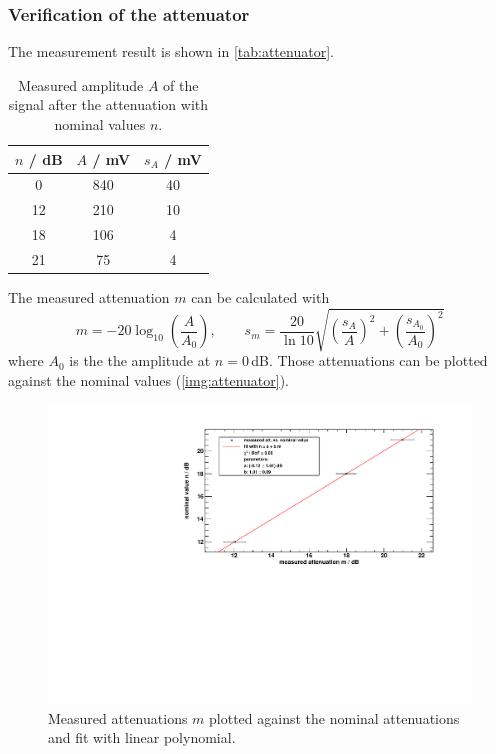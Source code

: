 \subsubsection{Verification of the attenuator}
The measurement result is shown in \autoref{tab:attenuator}.
\begin{table}
\caption{Measured amplitude $A$ of the signal after the attenuation with nominal values $n$.}
\begin{center}
\begin{tabular}{|c|c|c|}
    \hline
    $n$ / dB 	& $A$ / mV 	& $s_A$ / mV	\\ \hline \hline
    0 			& 840		& 40			\\ \hline
    12			& 210		& 10			\\ \hline
    18			& 106		& 4				\\ \hline
    21			& 75		& 4				\\ \hline
\end{tabular}
\end{center}
\label{tab:attenuator}
\end{table}
The measured attenuation $m$ can be calculated with
\begin{equation}
    m = - 20 \log_{10} \left( \frac{A}{A_0} \right), \qquad s_m = \frac{20}{\ln 10} \sqrt{ \left( \frac{s_A}{A} \right)^2 + \left( \frac{s_{A_0}}{A_0} \right)^2}
\end{equation}
where $A_0$ is the the amplitude at $n=0$\,dB.
Those attenuations can be plotted against the nominal values (\autoref{img:attenuator}).
\begin{figure}[H]
\begin{center}
  \includegraphics[width=\textwidth]{../img/attenuator.pdf}
  \caption{Measured attenuations $m$ plotted against the nominal attenuations and fit with linear polynomial.}
  \label{img:attenuator}
\end{center}
\end{figure}

